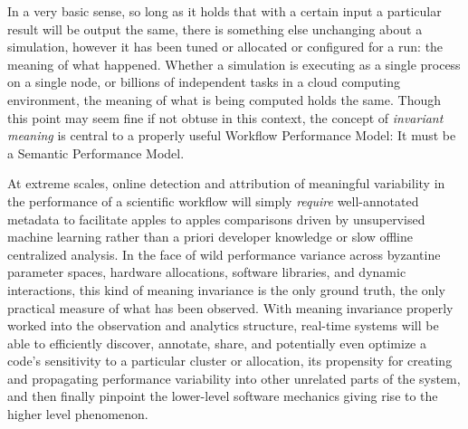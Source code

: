In a very basic sense, so long as it holds that with a certain input a
particular result will be output the same, there is something else
unchanging about a simulation, however it has been tuned or allocated
or configured for a run: the meaning of what happened.
%
Whether a simulation is executing as a single process on a single
node, or billions of independent tasks in a cloud computing
environment, the meaning of what is being computed holds the
same.
%
Though this point may seem fine if not obtuse in this context, the
concept of \textit{invariant meaning} is central to a properly useful
Workflow Performance Model: It must be a Semantic Performance Model.

At extreme scales, online detection and attribution of meaningful
variability in the performance of a scientific workflow will simply
\textit{require} well-annotated metadata to facilitate apples to
apples comparisons driven by unsupervised machine learning rather than
a priori developer knowledge or slow offline centralized analysis.
%
In the face of wild performance variance across byzantine parameter
spaces, hardware allocations, software libraries, and dynamic
interactions, this kind of meaning invariance is the only ground
truth, the only practical measure of what has been observed.
%
With meaning invariance properly worked into the observation and
analytics structure, real-time systems will be able to efficiently
discover, annotate, share, and potentially even optimize a code's
sensitivity to a particular cluster or allocation, its propensity for
creating and propagating performance variability into other unrelated
parts of the system, and then finally pinpoint the lower-level
software mechanics giving rise to the higher level phenomenon.


